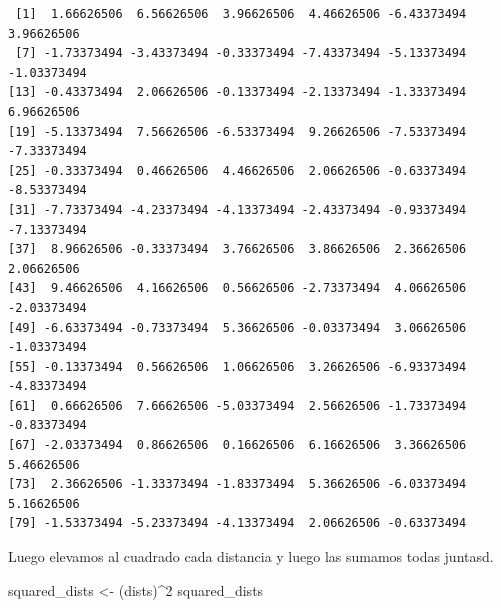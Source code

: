 \documentclass[
  letterpaper,
  DIV=11,
  numbers=noendperiod]{scrreprt}
\newenvironment{Shaded}{\begin{snugshade}}{\end{snugshade}}
\newcommand{\DecValTok}[1]{\textcolor[rgb]{0.68,0.00,0.00}{#1}}
\newcommand{\FunctionTok}[1]{\textcolor[rgb]{0.28,0.35,0.67}{#1}}
\newcommand{\NormalTok}[1]{\textcolor[rgb]{0.00,0.23,0.31}{#1}}
\newcommand{\OtherTok}[1]{\textcolor[rgb]{0.00,0.23,0.31}{#1}}
\newcommand{\SpecialCharTok}[1]{\textcolor[rgb]{0.37,0.37,0.37}{#1}}
\begin{document}
\begin{Shaded}
\end{Shaded}

\begin{verbatim}
 [1]  1.66626506  6.56626506  3.96626506  4.46626506 -6.43373494  3.96626506
 [7] -1.73373494 -3.43373494 -0.33373494 -7.43373494 -5.13373494 -1.03373494
[13] -0.43373494  2.06626506 -0.13373494 -2.13373494 -1.33373494  6.96626506
[19] -5.13373494  7.56626506 -6.53373494  9.26626506 -7.53373494 -7.33373494
[25] -0.33373494  0.46626506  4.46626506  2.06626506 -0.63373494 -8.53373494
[31] -7.73373494 -4.23373494 -4.13373494 -2.43373494 -0.93373494 -7.13373494
[37]  8.96626506 -0.33373494  3.76626506  3.86626506  2.36626506  2.06626506
[43]  9.46626506  4.16626506  0.56626506 -2.73373494  4.06626506 -2.03373494
[49] -6.63373494 -0.73373494  5.36626506 -0.03373494  3.06626506 -1.03373494
[55] -0.13373494  0.56626506  1.06626506  3.26626506 -6.93373494 -4.83373494
[61]  0.66626506  7.66626506 -5.03373494  2.56626506 -1.73373494 -0.83373494
[67] -2.03373494  0.86626506  0.16626506  6.16626506  3.36626506  5.46626506
[73]  2.36626506 -1.33373494 -1.83373494  5.36626506 -6.03373494  5.16626506
[79] -1.53373494 -5.23373494 -4.13373494  2.06626506 -0.63373494
\end{verbatim}

Luego elevamos al cuadrado cada distancia y luego las sumamos todas
juntasd.

\begin{Shaded}
\begin{Highlighting}[]
\NormalTok{squared\_dists }\OtherTok{\textless{}{-}}\NormalTok{ (dists)}\SpecialCharTok{\^{}}\DecValTok{2}
\NormalTok{squared\_dists}
\end{Highlighting}
\end{Shaded}
\end{document}
